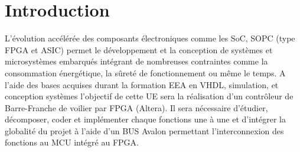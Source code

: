 \section*{Introduction}
\label{Introduction}
L'évolution accélérée des composants électroniques comme les SoC, SOPC (type FPGA et ASIC) permet le développement et la conception de systèmes et microsystèmes embarqués intégrant de nombreuses contraintes comme la consommation énergétique, la sûreté de fonctionnement ou même le temps. A l'aide des bases acquises durant la formation EEA en VHDL, simulation, et conception systèmes l'objectif de cette UE sera la réalisation d'un contrôleur de Barre-Franche de voilier par FPGA (Altera). Il sera nécessaire d'étudier, décomposer, coder et implémenter chaque fonctions une à une et d'intégrer la globalité du projet à l'aide d'un BUS Avalon permettant l'interconnexion des fonctions au MCU intégré au FPGA.
